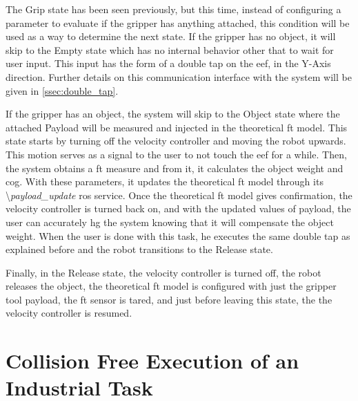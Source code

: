 \par The Grip state has been seen previously, but this time, instead of configuring a parameter to evaluate if the gripper has anything attached, this condition will be used as a way to determine the next state. If the gripper has no object, it will skip to the Empty state which has no internal behavior other that to wait for user input. This input has the form of a double tap on the \ac{eef}, in the Y-Axis direction. Further details on this communication interface with the system will be given in \autoref{ssec:double_tap}.

\par If the gripper has an object, the system will skip to the Object state where the attached Payload will be measured and injected in the theoretical \ac{ft} model. This state starts by turning off the velocity controller and moving the robot upwards. This motion serves as a signal to the user to not touch the \ac{eef} for a while. Then, the system obtains a \ac{ft} measure and from it, it calculates the object weight and \ac{cog}. With these parameters, it updates the theoretical \ac{ft} model through its \textbackslash\textit{payload\_update} \ac{ros} service. Once the theoretical \ac{ft} model gives confirmation, the velocity controller is turned back on, and with the updated values of payload, the user can accurately \ac{hg} the system knowing that it will compensate the object weight. When the user is done with this task, he executes the same double tap as explained before and the robot transitions to the Release state.

\par Finally, in the Release state, the velocity controller is turned off, the robot releases the object, the theoretical \ac{ft} model is configured with just the gripper tool payload, the \ac{ft} sensor is tared, and just before leaving this state, the the velocity controller is resumed.






\section{Collision Free Execution of an Industrial Task}


